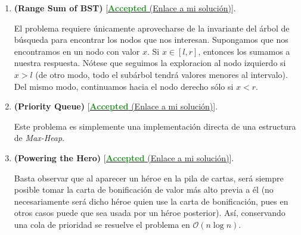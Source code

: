 \documentclass{article}
\begin{document}
    \begin{enumerate}[label=\textbf{Problema \Alph*}]
        \item \textbf{(Range Sum of BST)} [\href{https://leetcode.com/problems/range-sum-of-bst/submissions/1990615591}{\textcolor{ForestGreen}{\textbf{Accepted}} (Enlace a mi solución)}].

        El problema requiere únicamente aprovecharse de la invariante del árbol de búsqueda para encontrar los nodos que nos interesan. Supongamos que nos encontramos en un nodo con valor $x$. Si $x \in [l, r]$, entonces los sumamos a nuestra respuesta. Nótese que seguimos la exploracion al nodo izquierdo si $x > l$ (de otro modo, todo el subárbol tendrá valores menores al intervalo). Del mismo modo, continuamos hacia el nodo derecho sólo si $x < r$.

        \item \textbf{(Priority Queue)} [\href{https://judge.u-aizu.ac.jp/onlinejudge/review.jsp?rid=11445993}{\textcolor{ForestGreen}{\textbf{Accepted}} (Enlace a mi solución)}].   
        
        Este problema es simplemente una implementación directa de una estructura de \textit{Max-Heap}.
        
        \item \textbf{(Powering the Hero)} [\href{https://codeforces.com/contest/1800/submission/372897557}{\textcolor{ForestGreen}{\textbf{Accepted}} (Enlace a mi solución)}].
        
        Basta observar que al aparecer un héroe en la pila de cartas, será siempre posible tomar la carta de bonificación de valor más alto previa a él (no necesariamente será dicho héroe quien use la carta de bonificación, pues en otros casos puede que sea usada por un héroe posterior). Así, conservando una cola de prioridad se resuelve el problema en $\mathcal{O}(n \log n)$.
    \end{enumerate}
\end{document}
